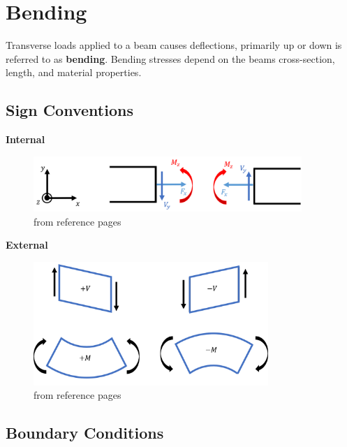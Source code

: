 \section{Bending}

Transverse loads applied to a beam causes deflections, primarily up or down is referred to as \textbf{bending}. Bending stresses depend on the beams cross-section, length, and material properties.

\subsection{Sign Conventions}

\textbf{Internal}

\begin{figure}[!h]
\centering
\includegraphics[angle=0, width=4in]{Bending-Figures/internalSignConvention.png}
\vspace{-2mm}
\caption{\small from reference pages}
\vspace{-3mm}
\label{Fig:InternalSigns}
\end{figure}

\noindent \textbf{External}

\begin{figure}[!h]
\centering
\includegraphics[angle=0, width=3.5in]{Bending-Figures/externalSignConvention.png}
\vspace{-2mm}
\caption{\small from reference pages}
\vspace{-3mm}
\label{Fig:ExternallSigns}
\end{figure}

\subsection{Boundary Conditions}

